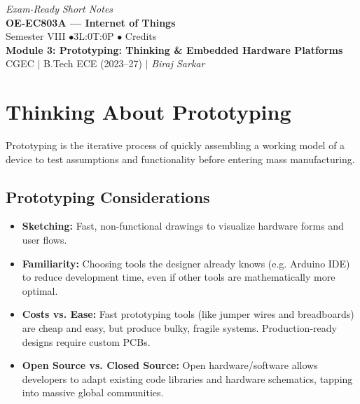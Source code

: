 \documentclass[12pt,a4paper]{article}
\begin{document}
\begin{center}
  \hfill \textit{Exam-Ready Short Notes} \\
  \vspace{6pt}
  {\LARGE\bfseries\color{myred} OE-EC803A --- Internet of Things}\\[5pt]
  {\normalsize\color{mydark} Semester VIII \quad$\bullet$\quad 3L:0T:0P \quad$\bullet$ Credits}\\[3pt]
  {\normalsize\color{myteal}\textbf{Module 3: Prototyping: Thinking \& Embedded Hardware Platforms}}\\[3pt]
  {\small\color{mydark} CGEC \;$|$\; B.Tech ECE (2023--27) \;$|$\; \textit{Biraj Sarkar}}
\end{center}
\vspace{2pt}
\noindent{\color{myred}\rule{\linewidth}{1.5pt}}
\vspace{2pt}

\hypersetup{linkcolor=mydark}
\tableofcontents
\hypersetup{linkcolor=myteal}
\newpage

\section{Thinking About Prototyping}

Prototyping is the iterative process of quickly assembling a working model of a device to test assumptions and functionality before entering mass manufacturing.

\subsection{Prototyping Considerations}
\begin{itemize}[leftmargin=*, itemsep=3pt]
  \item \textbf{Sketching:} Fast, non-functional drawings to visualize hardware forms and user flows.
  \item \textbf{Familiarity:} Choosing tools the designer already knows (e.g. Arduino IDE) to reduce development time, even if other tools are mathematically more optimal.
  \item \textbf{Costs vs. Ease:} Fast prototyping tools (like jumper wires and breadboards) are cheap and easy, but produce bulky, fragile systems. Production-ready designs require custom PCBs.
  \item \textbf{Open Source vs. Closed Source:} Open hardware/software allows developers to adapt existing code libraries and hardware schematics, tapping into massive global communities.
\end{itemize}
\end{document}
